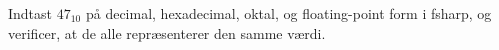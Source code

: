Indtast $47_{10}$ på decimal, hexadecimal, oktal, og floating-point form i fsharp, og verificer, at de alle repræsenterer den samme værdi.
